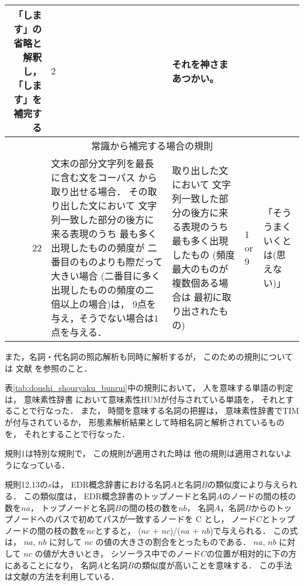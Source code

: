 \begin{table}[t]
\begin{center}
\begin{tabular}[c]{|@{ }r@{ }|p{4cm}|p{3cm}|@{ }p{0.6cm}@{ }|p{3.9cm}|}
  「します」の省略と解釈し，「します」を補完する &
  $2$&
  それを神さまあつかい。\\\hline
\multicolumn{5}{|c|}{常識から補完する場合の規則}\\\hline
  22&
  文末の部分文字列を最長に含む文をコーパス
  から取り出せる場合．
  その取り出した文において
  文字列一致した部分の後方に来る表現のうち
  最も多く出現したものの頻度が
  二番目のものよりも際だって大きい場合
  (二番目に多く出現したものの頻度の二倍以上の場合)は，
  9点を与え，そうでない場合は1点を与える．
  &
  取り出した文において
  文字列一致した部分の後方に来る表現のうち
  最も多く出現したもの
  (頻度最大のものが複数個ある場合は
  最初に取り出されたもの)
  &
  1 or 9&
  「そううまくいくとは(思えない)」
  \\\hline
\end{tabular}
\end{center}
\end{table}

\clearpage

また，名詞・代名詞の照応解析も同時に解析するが，
このための規則については
文献\cite{murata_noun_nlp}\cite{murata_deno_nlp}\cite{murata_indian_nlp}
を参照のこと．

表\ref{tab:doushi_shouryaku_bunrui}中の規則において，
人を意味する単語の判定は，
意味素性辞書\cite{imiso-in-BGH}
において意味素性HUMが付与されている単語を，
それとすることで行なった．
また，  時間を意味する名詞の把握は，
意味素性辞書でTIMが付与されているか，
形態素解析結果として時相名詞と解析されているものを，
それとすることで行なった．

規則1は特別な規則で，
この規則が適用された時は
他の規則は適用されないようになっている．

規則12,13の$s$は，
EDR概念辞書における名詞$A$と名詞$B$の類似度により与えられる．
この類似度は，
EDR概念辞書のトップノードと名詞$A$のノードの間の枝の数を$na$，
トップノードと名詞$B$の間の枝の数を$nb$，
名詞$A$，名詞$B$からのトップノードへのパスで初めてパスが一致するノードを
C とし，
ノード$C$とトップノードの間の枝の数を$nc$とすると，
($nc$ + $nc$)/($na$ + $nb$)で与えられる．
この式は，
$na$, $nb$ に対して $nc$ の値の大きさの割合をとったものである．
$na$, $nb$ に対して $nc$ の値が大きいとき，
シソーラス中でのノード$C$の位置が相対的に下の方にあることになり，
名詞\hspace{-0.2mm}$A$\hspace{-0.2mm}と名詞\hspace{-0.2mm}$B$\hspace{-0.2mm}の類似度が高いことを意味する．
この手法は文献\cite{nlp}の方法を利用している．

